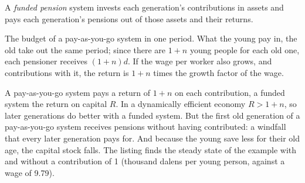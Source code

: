 \begin{definition}\label{def:b2:overlapping-generations:funded}
A \emph{funded pension} system invests each generation's contributions in assets and pays each
generation's pensions out of those assets and their returns.
\end{definition}

\begin{omfigure}

{\small The budget of a pay-as-you-go system in one period. What the young pay in, the old take out the same period; since
there are $1 + n$ young people for each old one, each pensioner receives $(1 + n)d$. If the wage per worker also grows, and contributions
with it, the return is $1 + n$ times the growth factor of the wage.}
\end{omfigure}

A pay-as-you-go system pays a return of $1 + n$ on each contribution, a funded system the return on capital $R$. In a dynamically efficient economy $R > 1 + n$, so later
generations do better with a funded system. But the first old generation of a pay-as-you-go system receives pensions without
having contributed: a windfall that every later generation pays for. And because the young save less for their old age,
the capital stock falls. The listing finds the steady state of the example with and without a contribution of 1 (thousand
dalens per young person, against a wage of 9.79).

\label{lst:b2:overlapping-generations:olg}

